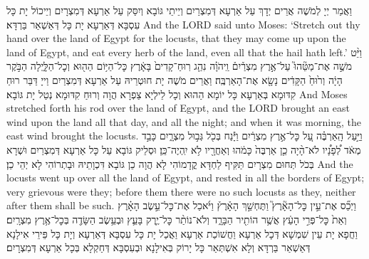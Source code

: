 {{}
{וַאֲמַר יְיָ לְמֹשֶׁה אֲרֵים יְדָךְ עַל אַרְעָא דְּמִצְרַיִם וְיֵיתֵי גּוֹבָא וְיִסַּק עַל אַרְעָא דְּמִצְרָיִם וְיֵיכוֹל יָת כָּל עִסְבָּא דְּאַרְעָא יָת כָּל דְּאַשְׁאַר בַּרְדָּא׃}
{And the LORD said unto Moses: ‘Stretch out thy hand over the land of Egypt for the locusts, that they may come up upon the land of Egypt, and eat every herb of the land, even all that the hail hath left.’}{}
{וַיֵּ֨ט מֹשֶׁ֣ה אֶת־מַטֵּ֘הוּ֮ עַל־אֶ֣רֶץ מִצְרַ֒יִם֒ וַֽיהֹוָ֗ה נִהַ֤ג רֽוּחַ־קָדִים֙ בָּאָ֔רֶץ כׇּל־הַיּ֥וֹם הַה֖וּא וְכׇל־הַלָּ֑יְלָה הַבֹּ֣קֶר הָיָ֔ה וְר֙וּחַ֙ הַקָּדִ֔ים נָשָׂ֖א אֶת־הָאַרְבֶּֽה׃
}
{וַאֲרֵים מֹשֶׁה יָת חוּטְרֵיהּ עַל אַרְעָא דְּמִצְרַיִם וַייָ דַּבַּר רוּחַ קִדּוּמָא בְּאַרְעָא כָּל יוֹמָא הַהוּא וְכָל לֵילְיָא צַפְרָא הֲוָה וְרוּחַ קִדּוּמָא נְטַל יָת גּוֹבָא׃}
{And Moses stretched forth his rod over the land of Egypt, and the LORD brought an east wind upon the land all that day, and all the night; and when it was morning, the east wind brought the locusts.}{}
{וַיַּ֣עַל הָֽאַרְבֶּ֗ה עַ֚ל כׇּל־אֶ֣רֶץ מִצְרַ֔יִם וַיָּ֕נַח בְּכֹ֖ל גְּב֣וּל מִצְרָ֑יִם כָּבֵ֣ד מְאֹ֔ד לְ֠פָנָ֠יו לֹא־הָ֨יָה כֵ֤ן אַרְבֶּה֙ כָּמֹ֔הוּ וְאַחֲרָ֖יו לֹ֥א יִֽהְיֶה־כֵּֽן׃
}
{וּסְלֵיק גּוֹבָא עַל כָּל אַרְעָא דְּמִצְרַיִם וּשְׁרָא בְּכֹל תְּחוּם מִצְרָיִם תַּקִּיף לַחְדָּא קֳדָמוֹהִי לָא הֲוָה כֵן גּוֹבָא דִּכְוָתֵיהּ וּבָתְרוֹהִי לָא יְהֵי כֵן׃}
{And the locusts went up over all the land of Egypt, and rested in all the borders of Egypt; very grievous were they; before them there were no such locusts as they, neither after them shall be such.}{}
{וַיְכַ֞ס אֶת־עֵ֣ין כׇּל־הָאָ֘רֶץ֮ וַתֶּחְשַׁ֣ךְ הָאָ֒רֶץ֒ וַיֹּ֜אכַל אֶת־כׇּל־עֵ֣שֶׂב הָאָ֗רֶץ וְאֵת֙ כׇּל־פְּרִ֣י הָעֵ֔ץ אֲשֶׁ֥ר הוֹתִ֖יר הַבָּרָ֑ד וְלֹא־נוֹתַ֨ר כׇּל־יֶ֧רֶק בָּעֵ֛ץ וּבְעֵ֥שֶׂב הַשָּׂדֶ֖ה בְּכׇל־אֶ֥רֶץ מִצְרָֽיִם׃
}
{וַחֲפָא יָת עֵין שִׁמְשָׁא דְּכָל אַרְעָא וַחֲשׁוֹכַת אַרְעָא וַאֲכַל יָת כָּל עִסְבָּא דְּאַרְעָא וְיָת כָּל פֵּירֵי אִילָנָא דְּאַשְׁאַר בַּרְדָּא וְלָא אִשְׁתְּאַר כָּל יָרוֹק בְּאִילָנָא וּבְעִסְבָּא דְּחַקְלָא בְּכָל אַרְעָא דְּמִצְרָיִם׃}
}
